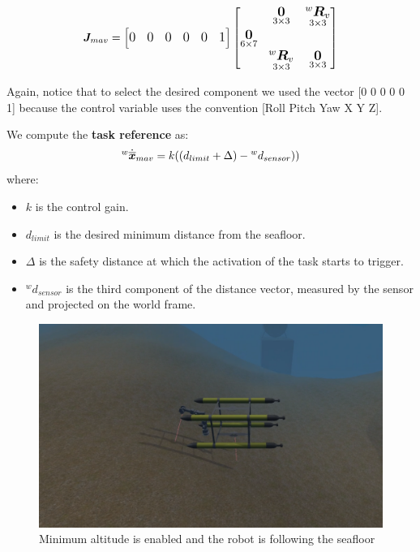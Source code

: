 \documentclass{article}
\begin{document}
\begin{equation}
\large
\boldsymbol{J}_{mav}=\begin{bmatrix} 0 & 0 & 0 & 0 & 0 & 1
\end{bmatrix}
    \begin{bmatrix}
     & \underset{3\times 3}{\boldsymbol{0}} & \underset{ 3\times 3}{^{w}\boldsymbol{R}_{v}} \\
     \underset{ 6\times 7}{\boldsymbol{0}} \\
     & \underset{ 3\times 3}{^{w}\boldsymbol{R}_{v}} & \underset{3\times 3}{\boldsymbol{0}} \\
    \end{bmatrix}
\end{equation}

Again, notice that to select the desired component we used the vector [0 0 0 0 0 1] because the control variable uses the convention [Roll Pitch Yaw X Y Z].

\noindent
\vspace{5px}
We compute the \textbf{task reference} as: 
\begin{equation}
\large
    ^{w}\dot{\overline{\boldsymbol{x}}}_{mav} = k((d_{limit}+\Delta)- {^w}d_{sensor})) %
\end{equation}
where:
\begin{itemize}
    \item $k$ is the control gain.
    \item $d_{limit}$ is the desired minimum distance from the seafloor.
    \item $ \Delta $ is the safety distance at which the activation of the task starts to trigger.
    \item $^w d_{sensor}$ is the third component of the distance vector, measured by the sensor and projected on the world frame.
\end{itemize} 

\begin{figure}[t]
    \centering
    \includegraphics[scale=0.4]{122_MAV1m.png}
    \caption{Minimum altitude is enabled and the robot is following the seafloor}
    \label{images_2_1}
\end{figure}
\end{document}
